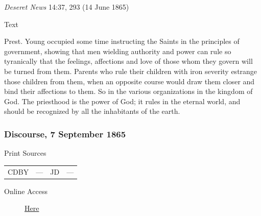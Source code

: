					\textit{Deseret News} 14:37, 293 (14 June 1865)
				
				\begin{description}
					\item[Text]
				\end{description}
					
					Prest. Young occupied some time instructing the Saints in the principles of government, showing that men wielding authority and power can rule so tyranically that the feelings, affections and love of those whom they govern will be turned from them. Parents who rule their children with iron severity estrange those children from them, when an opposite course would draw them closer and bind their affections to them. So in the various organizations in the kingdom of God. The priesthood is the power of God; it rules in the eternal world, and should be recognized by all the inhabitants of the earth.
			
		\subsubsection{Discourse, 7 September 1865}
			\label{EMS-1865-BY-7-SEP-1865}
			
			\begin{description}
					\item[Print Sources]
				\end{description}

					\begin{tabular}{p{0.5in}p{1in}p{0.5in}p{1in}}
					CDBY	& ---		& JD 		& --- \\
					\end{tabular}
				
				\begin{description}
					\item[Online Access] \href{https://catalog.churchofjesuschrist.org/assets/92e3ef48-c3c0-4d38-85d9-96e90d2b4fc6/0/0}{Here}
				\end{description}
				
